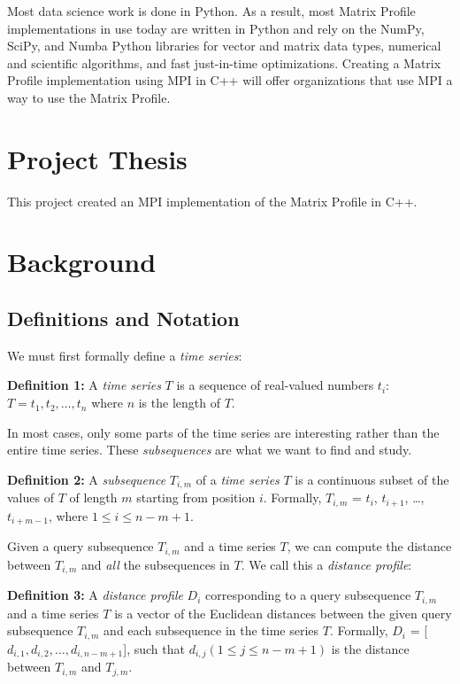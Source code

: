 \documentclass[conference]{IEEEtran}
\begin{document}
Most data science work is done in Python.  As a result, most Matrix Profile implementations in use today are written in Python\cite{Stumpy} and rely on the NumPy, SciPy, and Numba Python libraries for vector and matrix data types, numerical and scientific algorithms, and fast just-in-time optimizations.  Creating a Matrix Profile implementation using MPI in C++ will offer organizations that use MPI a way to use the Matrix Profile. 

\section{Project Thesis}
This project created an MPI implementation of the Matrix Profile in C++.

\section{Background}
\subsection{Definitions and Notation}

We must first formally define a \emph{time series}:

\textbf{Definition 1:} A \emph{time series} $T$ is a sequence of real-valued numbers $t_i$: $T = t_1, t_2, \ldots{}, t_n$ where $n$ is the length of $T$.

In most cases, only some parts of the time series are interesting rather than the entire time series.  These \emph{subsequences} are what we want to find and study.

\textbf{Definition 2:} A \emph{subsequence} $T_{i,m}$ of a \emph{time series} $T$ is a continuous subset of the values of $T$ of length $m$ starting from position $i$.  Formally, $T_{i,m}$ = $t_i$, $t_{i+1}$, \ldots{}, $t_{i+m-1}$, where $1 \leq i \leq n-m+1$.

Given a query subsequence $T_{i,m}$ and a time series $T$, we can compute the distance between $T_{i,m}$ and \emph{all} the subsequences in $T$.  We call this a \emph{distance profile}:

\textbf{Definition 3:} A \emph{distance profile} $D_i$ corresponding to a query subsequence $T_{i,m}$ and a time series $T$ is a vector of the Euclidean distances between the given query subsequence $T_{i,m}$ and each subsequence in the time series $T$.  Formally, $D_i$ = [$d_{i,1}, d_{i,2}, \ldots{}, d_{i,n-m+1}$], such that $d_{i,j}(1 \leq j \leq n-m+1)$ is the distance between $T_{i,m}$ and $T_{j,m}$.
\end{document}
